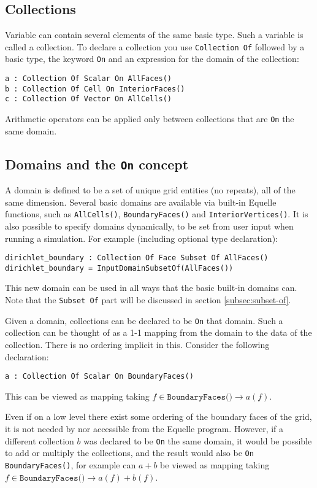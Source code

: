 \documentclass[11pt]{article}
\newcommand{\code}[1]{\texttt{#1}}
\begin{document}
\subsection{Collections}

Variable can contain several elements of the same basic type. Such a variable is called a
collection. To declare a collection you use \code{Collection Of} followed by a basic type,
the keyword \code{On} and an expression for the domain of the collection:

\code{a : Collection Of Scalar On AllFaces() \\
b : Collection Of Cell On InteriorFaces() \\
c : Collection Of Vector On AllCells()
}

Arithmetic operators can be applied only between collections that are \code{On} the same
domain.

\subsection{Domains and the \code{On} concept}
\label{subsec:domains-on}

A domain is defined to be a set of unique grid entities (no repeats), all of the same
dimension. Several basic domains are available via built-in Equelle functions, such as
\code{AllCells()}, \code{BoundaryFaces()} and \code{InteriorVertices()}. It is also
possible to specify domains dynamically, to be set from user input when running a
simulation. For example (including optional type declaration):

\code{dirichlet\_boundary : Collection Of Face Subset Of AllFaces()\\
dirichlet\_boundary =  InputDomainSubsetOf(AllFaces())
}

This new domain can be used in all ways that the basic built-in domains can. Note that the
\code{Subset Of} part will be discussed in section \ref{subsec:subset-of}.

Given a domain, collections can be declared to be \code{On} that domain. Such a collection
can be thought of as a 1-1 mapping from the domain to the data of the collection. There is
no ordering implicit in this. Consider the following declaration:

\code{a : Collection Of Scalar On BoundaryFaces()
}

This can be viewed as mapping taking $f \in \code{BoundaryFaces()} \to a(f)$.

Even if on a low level there exist some ordering of the boundary faces of the grid, it is
not needed by nor accessible from the Equelle program. However, if a different collection
$b$ was declared to be \code{On} the same domain, it would be possible to add or multiply
the collections, and the result would also be \code{On BoundaryFaces()}, for example can
$a + b$ be viewed as mapping taking $f \in \code{BoundaryFaces()} \to a(f) + b(f)$. 
\end{document}

